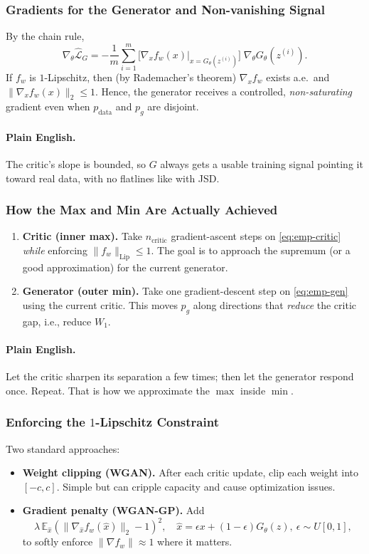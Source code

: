 \documentclass[11pt]{article}
\theoremstyle{remark}
\begin{document}
\subsubsection{Gradients for the Generator and Non-vanishing Signal}
By the chain rule,
\begin{equation}
\nabla_\theta \widehat{\mathcal{L}}_{G}
= - \frac{1}{m}\sum_{i=1}^m \Big[\nabla_x f_w(x)\big|_{x=G_\theta(z^{(i)})}\Big]\;\nabla_\theta G_\theta(z^{(i)}).
\label{eq:gen-grad}
\end{equation}
If $f_w$ is $1$-Lipschitz, then (by Rademacher's theorem) $\nabla_x f_w$ exists a.e.\ and $\|\nabla_x f_w(x)\|_2\le 1$. Hence, the generator receives a controlled, \emph{non-saturating} gradient even when $p_{\text{data}}$ and $p_g$ are disjoint.

\paragraph{Plain English.}
The critic's slope is bounded, so $G$ always gets a usable training signal pointing it toward real data, with no flatlines like with JSD.

\subsubsection{How the Max and Min Are Actually Achieved}
\begin{enumerate}
\item \textbf{Critic (inner max).} Take $n_{\text{critic}}$ gradient-ascent steps on \eqref{eq:emp-critic} \emph{while} enforcing $\|f_w\|_{\mathrm{Lip}}\le 1$. The goal is to approach the supremum (or a good approximation) for the current generator.
\item \textbf{Generator (outer min).} Take one gradient-descent step on \eqref{eq:emp-gen} using the current critic. This moves $p_g$ along directions that \emph{reduce} the critic gap, i.e., reduce $W_1$.
\end{enumerate}

\paragraph{Plain English.}
Let the critic sharpen its separation a few times; then let the generator respond once. Repeat. That is how we approximate the $\max$ inside $\min$.

\subsubsection{Enforcing the $1$-Lipschitz Constraint}
Two standard approaches:
\begin{itemize}
\item \textbf{Weight clipping (WGAN).} After each critic update, clip each weight into $[-c,c]$. Simple but can cripple capacity and cause optimization issues.
\item \textbf{Gradient penalty (WGAN-GP).} Add
\[
\lambda\,\mathbb{E}_{\hat{x}}\!\left(\|\nabla_{\hat{x}} f_w(\hat{x})\|_2-1\right)^2,
\quad \hat{x}=\epsilon x+(1-\epsilon)G_\theta(z),\ \epsilon\sim U[0,1],
\]
to softly enforce $\|\nabla f_w\|\approx 1$ where it matters.
\end{itemize}
\end{document}
